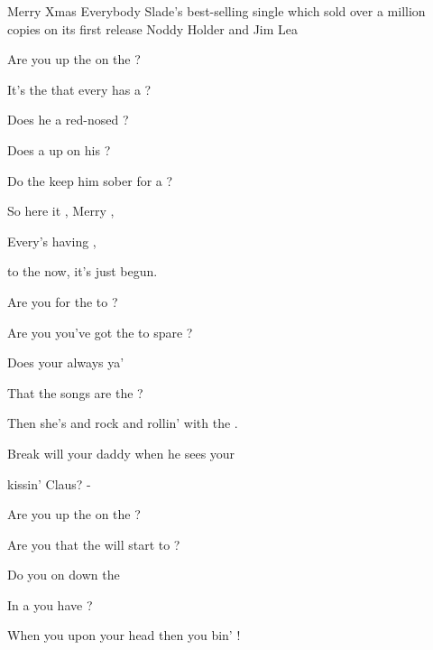 \begin{SBSong}{Merry Xmas Everybody}
    {Slade's best-selling single which sold over a million copies on its first release}
    {Noddy Holder and Jim Lea}
  \begin{SBVerse}
	Are you  up the  on the ?
	
	It's the  that every  has a ?
	
	Does he  a red-nosed ?
	
	Does a  up on his ?
	
	Do the  keep him sober for a ?  
  \end{SBVerse}
  
  \begin{SBChorus}
	So here it , Merry ,
	
	Every's having ,
	
	 to the  now, it's  just begun.   
  \end{SBChorus}
  \begin{SBVerse}
	Are you  for the  to ?
	
	Are you  you've got the  to spare ?
	
	Does your  always  ya'
	
	That the  songs are the ?
	
	Then she's  and rock and rollin' with the . 
  \end{SBVerse}
  \begin{SBBracket}{Break}
	 will your daddy  when he sees your
	
	 kissin'  Claus? - 
  \end{SBBracket}
  \begin{SBVerse}
	Are you  up the  on the ?
	
	Are you  that the  will start to ?
	
	Do you  on down the 
	
	In a  you have ?
	
	When you  upon your head then you bin' !  
  \end{SBVerse}
\end{SBSong}
